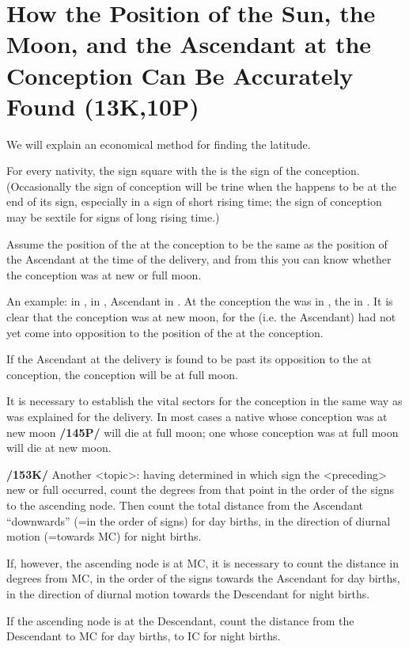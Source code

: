 \section{How the Position of the Sun, the Moon, and the Ascendant at the Conception Can Be Accurately Found (13K,10P)}

We will explain an economical method for finding the latitude. 

For every nativity, the sign square with the \Sun\xspace is the sign of the conception. (Occasionally the sign of conception will be trine when the \Sun\xspace happens to be at the end of its sign, especially in a sign of short rising time; the sign of conception may be sextile for signs of long rising time.) 

Assume the position of the \Moon\xspace at the conception to be the same as the position of the Ascendant at the time of the delivery, and from this you can know whether the conception was at new or full moon.

An example: \Sun\xspace in \Aquarius, \Moon\xspace in \Scorpio, Ascendant in \Virgo. At the conception the \Sun\xspace was
in \Taurus, the \Moon\xspace in \Virgo. It is clear that the conception was at new moon, for the \Moon\xspace (i.e. the
Ascendant) had not yet come into opposition to the position of the \Sun\xspace at the conception. 

If the Ascendant at the delivery is found to be past its opposition to the \Sun\xspace at conception, the conception will be at full moon.

It is necessary to establish the vital sectors for the conception in the same way as was explained for the delivery. In most cases a native whose conception was at new moon \textbf{/145P/} will die at full moon; one whose conception was at full moon will die at new moon.

\textbf{/153K/} Another <topic>: having determined in which sign the <preceding> new or full \Moon\xspace occurred, count the degrees from that point in the order of the signs to the ascending node. Then count the total distance from the Ascendant “downwards” (=in the order of signs) for day births, in the direction of diurnal motion (=towards MC) for night births. 

If, however, the ascending node is at MC, it is necessary to count the distance in degrees from MC, in the order of the signs towards the Ascendant for day births, in the direction of diurnal motion towards the Descendant for night births. 

If the ascending node is at the Descendant, count the distance from the Descendant to MC for day births, to IC for night births. 

